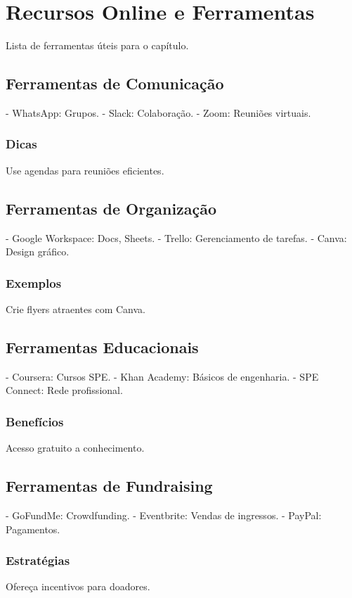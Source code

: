 \documentclass[12pt]{article}
\begin{document}
\newpage

\section{Recursos Online e Ferramentas}

Lista de ferramentas úteis para o capítulo.

\subsection{Ferramentas de Comunicação}
- WhatsApp: Grupos.
- Slack: Colaboração.
- Zoom: Reuniões virtuais.

\subsubsection{Dicas}
Use agendas para reuniões eficientes.

\subsection{Ferramentas de Organização}
- Google Workspace: Docs, Sheets.
- Trello: Gerenciamento de tarefas.
- Canva: Design gráfico.

\subsubsection{Exemplos}
Crie flyers atraentes com Canva.

\subsection{Ferramentas Educacionais}
- Coursera: Cursos SPE.
- Khan Academy: Básicos de engenharia.
- SPE Connect: Rede profissional.

\subsubsection{Benefícios}
Acesso gratuito a conhecimento.

\subsection{Ferramentas de Fundraising}
- GoFundMe: Crowdfunding.
- Eventbrite: Vendas de ingressos.
- PayPal: Pagamentos.

\subsubsection{Estratégias}
Ofereça incentivos para doadores.
\end{document}
